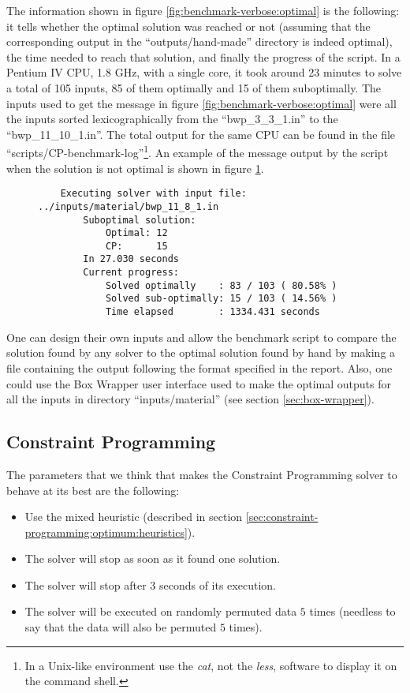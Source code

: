 The information shown in figure \ref{fig:benchmark-verbose:optimal} is the following:
it tells whether the optimal solution was reached or not (assuming that the
corresponding output in the ``outputs/hand-made'' directory is indeed optimal),
the time needed to reach that solution, and finally the progress of the script.
In a Pentium IV CPU, 1.8 GHz, with a single core, it took around 23 minutes to
solve a total of 105 inputs, 85 of them optimally and 15 of them suboptimally.
The inputs used to get the message in figure \ref{fig:benchmark-verbose:optimal} were
all the inputs sorted lexicographically from the ``bwp\_3\_3\_1.in'' to the
``bwp\_11\_10\_1.in''. The total output for the same CPU can be found
in the file ``scripts/CP-benchmark-log''\footnote{In a Unix-like environment use
the \textit{cat}, not the \textit{less}, software to display it on the command shell.}.
An example of the message output by the script when the solution is not optimal is
shown in figure \ref{fig:benchmark-verbose:suboptimal}.

\begin{figure}[H]
\centering
\begin{verbatim}
	Executing solver with input file: ../inputs/material/bwp_11_8_1.in
		Suboptimal solution:
			Optimal: 12
			CP:      15
		In 27.030 seconds
		Current progress:
			Solved optimally    : 83 / 103 ( 80.58% )
			Solved sub-optimally: 15 / 103 ( 14.56% )
			Time elapsed        : 1334.431 seconds
\end{verbatim}
\label{fig:benchmark-verbose:suboptimal}
\end{figure}

\hfill

One can design their own inputs and allow the benchmark script to compare
the solution found by any solver to the optimal solution found by hand by
making a file containing the output following the format specified in the
report. Also, one could use the Box Wrapper user interface used to make the
optimal outputs for all the inputs in directory ``inputs/material'' (see
section \ref{sec:box-wrapper}).

\subsection{Constraint Programming}
\label{sec:benchmarking:constraint-programming}

The parameters that we think that makes the Constraint Programming solver to behave
at its best are the following:
\begin{itemize}
	\item Use the mixed heuristic (described in section \ref{sec:constraint-programming:optimum:heuristics}).
	\item The solver will stop as soon as it found one solution.
	\item The solver will stop after 3 seconds of its execution.
	\item The solver will be executed on randomly permuted data $5$ times (needless to
	say that the data will also be permuted $5$ times).
\end{itemize}